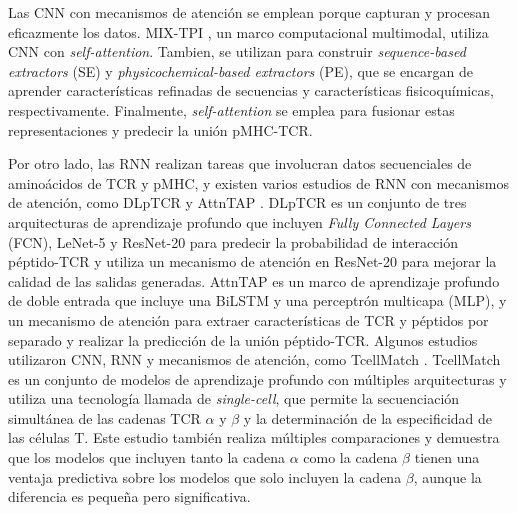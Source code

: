 Las CNN con mecanismos de atención se emplean porque capturan y procesan eficazmente los datos. MIX-TPI \citep{yang2023mix}, un marco computacional multimodal, utiliza CNN con \textit{self-attention}. Tambien, se utilizan para construir \textit{sequence-based extractors} (SE) y \textit{physicochemical-based extractors} (PE), que se encargan de aprender características refinadas de secuencias y características fisicoquímicas, respectivamente. Finalmente,  \textit{self-attention} se emplea para fusionar estas representaciones y predecir la unión pMHC-TCR.

Por otro lado, las RNN realizan tareas que involucran datos secuenciales de aminoácidos de TCR y pMHC, y existen varios estudios de RNN con mecanismos de atención, como DLpTCR \citep{xu2021dlptcr} y AttnTAP \citep{xu2022attntap}. DLpTCR es un conjunto de tres arquitecturas de aprendizaje profundo que incluyen \textit{Fully Connected Layers} (FCN), LeNet-5 y ResNet-20 para predecir la probabilidad de interacción péptido-TCR y utiliza un mecanismo de atención en ResNet-20 para mejorar la calidad de las salidas generadas. AttnTAP es un marco de aprendizaje profundo de doble entrada que incluye una BiLSTM y una perceptrón multicapa (MLP), y un mecanismo de atención para extraer características de TCR y péptidos por separado y realizar la predicción de la unión péptido-TCR. Algunos estudios utilizaron CNN, RNN y mecanismos de atención, como TcellMatch \citep{fischer2020predicting}. TcellMatch es un conjunto de modelos de aprendizaje profundo con múltiples arquitecturas y utiliza una tecnología llamada de \textit{single-cell}, que permite la secuenciación simultánea de las cadenas TCR $\alpha$ y $\beta$ y la determinación de la especificidad de las células T. Este estudio también realiza múltiples comparaciones y demuestra que los modelos que incluyen tanto la cadena $\alpha$ como la cadena $\beta$ tienen una ventaja predictiva sobre los modelos que solo incluyen la cadena $\beta$, aunque la diferencia es pequeña pero significativa.

